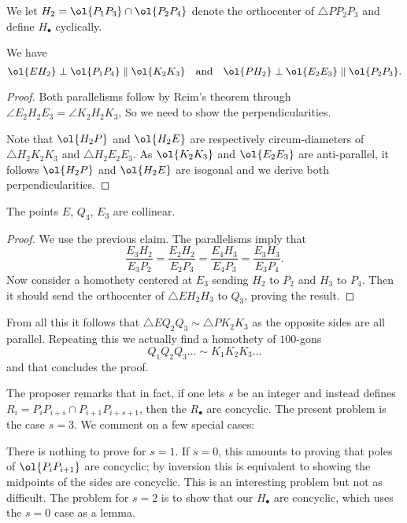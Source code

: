 \documentclass[11pt]{scrartcl}
\begin{document}
We let $H_2 = \ol{P_1P_3} \cap \ol{P_2P_4}$
denote the orthocenter of $\triangle PP_2P_3$
and define $H_\bullet$ cyclically.
\begin{claim*}
  We have
  \[ \ol{EH_2} \perp \ol{P_1 P_4} \parallel \ol{K_2 K_3}
    \quad\text{and}\quad
    \ol{PH_2} \perp \ol{E_2 E_3} \parallel \ol{P_2 P_3}.  \]
\end{claim*}
\begin{proof}
  Both parallelisms follow by Reim's theorem through
  $\angle E_2 H_2 E_3 = \angle K_2 H_2 K_3$,
  So we need to show the perpendicularities.

  Note that $\ol{H_2 P}$ and $\ol{H_2 E}$
  are respectively circum-diameters of
  $\triangle H_2K_2K_3$ and $\triangle H_2E_2E_3$.
  As $\ol{K_2 K_3}$ and $\ol{E_2 E_3}$ are anti-parallel,
  it follows $\ol{H_2P}$ and $\ol{H_2E}$ are isogonal
  and we derive both perpendicularities.
\end{proof}

\begin{claim*}
  The points $E$, $Q_3$, $E_3$ are collinear.
\end{claim*}
\begin{proof}
  We use the previous claim.
  The parallelisms imply that
  \[ \frac{E_3H_2}{E_3P_2} = \frac{E_2H_2}{E_2P_3}
    = \frac{E_4H_3}{E_4P_3} = \frac{E_3H_3}{E_3P_4}. \]
  Now consider a homothety centered at $E_3$ sending $H_2$ to $P_2$
  and $H_3$ to $P_4$.
  Then it should send the orthocenter of $\triangle EH_2H_3$ to $Q_3$,
  proving the result.
\end{proof}

From all this it follows that $\triangle EQ_2Q_3 \sim \triangle PK_2K_3$
as the opposite sides are all parallel.
Repeating this we actually find a homothety of $100$-gons
\[ Q_1 Q_2 Q_3 \dots \sim K_1 K_2 K_3 \dots \]
and that concludes the proof.

\begin{remark*}
  The proposer remarks that in fact,
  if one lets $s$ be an integer
  and instead defines $R_i = P_i P_{i+s} \cap P_{i+1} P_{i+s+1}$,
  then the $R_\bullet$ are concyclic.
  The present problem is the case $s=3$.
  We comment on a few special cases:
  \begin{itemize}
    \ii There is nothing to prove for $s=1$.
    \ii If $s=0$, this amounts to proving
    that poles of $\ol{P_i P_{i+1}}$ are concyclic;
    by inversion this is equivalent to showing the
    midpoints of the sides are concyclic.
    This is an interesting problem but not as difficult.
    \ii The problem for $s=2$ is to show that our $H_\bullet$
    are concyclic, which uses the $s=0$ case as a lemma.
  \end{itemize}
\end{remark*}
\end{document}
